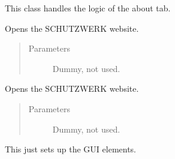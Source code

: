 \documentclass[letterpaper,10pt,english]{sphinxmanual}
\begin{document}
\begin{fulllineitems}
\label{\detokenize{src:src.AboutTab.AboutTab}}
This class handles the logic of the about tab.

\begin{fulllineitems}
\label{\detokenize{src:src.AboutTab.AboutTab.browseGitHub}}
Opens the SCHUTZWERK website.
\begin{quote}\begin{description}
\item[{Parameters}] \leavevmode
{} \textendash{} Dummy, not used.

\end{description}\end{quote}

\end{fulllineitems}


\begin{fulllineitems}
\label{\detokenize{src:src.AboutTab.AboutTab.browseSW}}
Opens the SCHUTZWERK website.
\begin{quote}\begin{description}
\item[{Parameters}] \leavevmode
{} \textendash{} Dummy, not used.

\end{description}\end{quote}

\end{fulllineitems}


\begin{fulllineitems}
\label{\detokenize{src:src.AboutTab.AboutTab.prepareUI}}
This just sets up the GUI elements.

\end{fulllineitems}


\end{fulllineitems}
\end{document}
